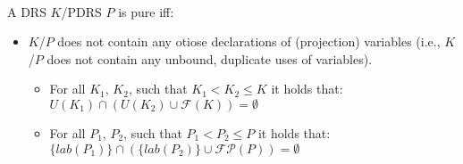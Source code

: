 \begin{definition}[Purity]~\\
A DRS $K$/PDRS $P$ is pure iff:
\begin{itemize}
  \item $K$/$P$ does not contain any otiose declarations of (projection)
    variables (i.e., $K$/$P$ does not contain any unbound, duplicate uses
    of variables).
    \begin{itemize}
      \item For all $K_1$, $K_2$, such that $K_1 < K_2 \leq K$ it holds that:
        $U(K_1) \cap (U(K_2) \cup \mathcal{F}(K)) = \emptyset$
      \item For all $P_1$, $P_2$, such that $P_1 < P_2 \leq P$ it holds that: 
        $\{lab(P_1)\} \cap (\{lab(P_2)\} \cup \mathcal{FP}(P)) = \emptyset$
    \end{itemize}
\end{itemize}
\end{definition}


